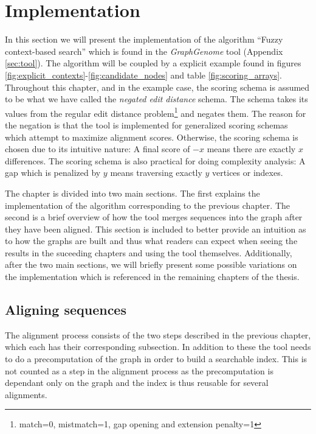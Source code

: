 \documentclass[thesis.tex]{subfiles}
\begin{document}
\chapter{Implementation}
In this section we will present the implementation of the algorithm ``Fuzzy context-based search'' which is found in the \textit{GraphGenome} tool (Appendix \ref{sec:tool}). The algorithm will be coupled by a explicit example found in figures \ref{fig:explicit_contexts}-\ref{fig:candidate_nodes} and table \ref{fig:scoring_arrays}. Throughout this chapter, and in the example case, the scoring schema is assumed to be what we have called the \textit{negated edit distance} schema. The schema takes its values from the regular edit distance problem\footnote{match=0, mistmatch=1, gap opening and extension penalty=1} and negates them. The reason for the negation is that the tool is implemented for generalized scoring schemas which attempt to maximize alignment scores.  Otherwise, the scoring schema is chosen due to its intuitive nature: A final score of $-x$ means there are exactly $x$ differences. The scoring schema is also practical for doing complexity analysis: A gap which is penalized by $y$ means traversing exactly $y$ vertices or indexes.\\
\par\noindent
The chapter is divided into two main sections. The first explains the implementation of the algorithm corresponding to the previous chapter. The second is a brief overview of how the tool merges sequences into the graph after they have been aligned. This section is included to better provide an intuition as to how the graphs are built and thus what readers can expect when seeing the results in the suceeding chapters and using the tool themselves. Additionally, after the two main sections, we will briefly present some possible variations on the implementation which is referenced in the remaining chapters of the thesis.
\section{Aligning sequences}
The alignment process consists of the two steps described in the previous chapter, which each has their corresponding subsection. In addition to these the tool needs to do a precomputation of the graph in order to build a searchable index. This is not counted as a step in the alignment process as the precomputation is dependant only on the graph and the index is thus reusable for several alignments.
\end{document}
